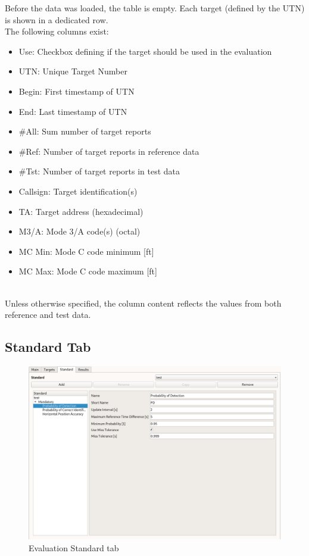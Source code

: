 Before the data was loaded, the table is empty. Each target (defined by the UTN) is shown in a dedicated row. \\

The following columns exist:

\begin{itemize}  
\item Use: Checkbox defining if the target should be used in the evaluation
\item UTN: Unique Target Number
\item Begin: First timestamp of UTN
\item End: Last timestamp of UTN
\item \#All: Sum number of target reports
\item \#Ref: Number of target reports in reference data
\item \#Tst: Number of target reports in test data
\item Callsign: Target identification(s)
\item TA: Target address (hexadecimal)
\item M3/A: Mode 3/A code(s) (octal)
\item MC Min: Mode C code minimum [ft]
\item MC Max: Mode C code maximum [ft]
\end{itemize}
\ \\

Unless otherwise specified, the column content reflects the values from both reference and test data.

\subsection{Standard Tab}

\begin{figure}[H]
  \hspace*{-2cm}
    \includegraphics[width=18cm,frame]{../screenshots/eval_standard.png}
  \caption{Evaluation Standard tab}
\end{figure}

